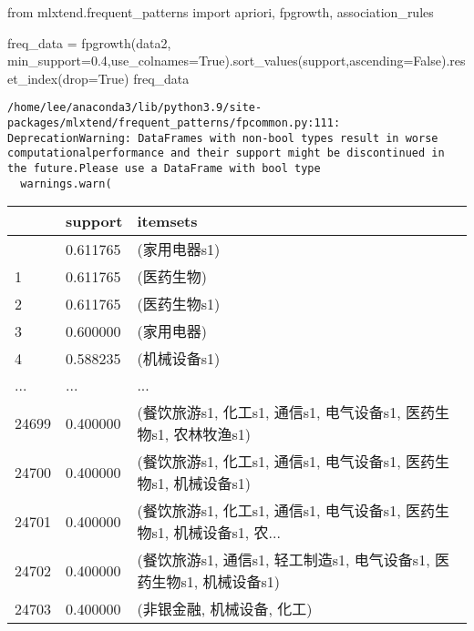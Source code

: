\documentclass[
  letterpaper,
  DIV=11,
  numbers=noendperiod]{scrreprt}
\newenvironment{Shaded}{\begin{snugshade}}{\end{snugshade}}
\newcommand{\FloatTok}[1]{\textcolor[rgb]{0.68,0.00,0.00}{#1}}
\newcommand{\ImportTok}[1]{\textcolor[rgb]{0.00,0.46,0.62}{#1}}
\newcommand{\NormalTok}[1]{\textcolor[rgb]{0.00,0.23,0.31}{#1}}
\newcommand{\OperatorTok}[1]{\textcolor[rgb]{0.37,0.37,0.37}{#1}}
\newcommand{\StringTok}[1]{\textcolor[rgb]{0.13,0.47,0.30}{#1}}
\newcommand{\VariableTok}[1]{\textcolor[rgb]{0.07,0.07,0.07}{#1}}
\begin{document}
\begin{Shaded}
\begin{Highlighting}[]
\ImportTok{from}\NormalTok{ mlxtend.frequent\_patterns }\ImportTok{import}\NormalTok{ apriori, fpgrowth, association\_rules}

\NormalTok{freq\_data }\OperatorTok{=}\NormalTok{ fpgrowth(data2, min\_support}\OperatorTok{=}\FloatTok{0.4}\NormalTok{,use\_colnames}\OperatorTok{=}\VariableTok{True}\NormalTok{).sort\_values(}\StringTok{\textquotesingle{}support\textquotesingle{}}\NormalTok{,ascending}\OperatorTok{=}\VariableTok{False}\NormalTok{).reset\_index(drop}\OperatorTok{=}\VariableTok{True}\NormalTok{)}
\NormalTok{freq\_data}
\end{Highlighting}
\end{Shaded}

\begin{verbatim}
/home/lee/anaconda3/lib/python3.9/site-packages/mlxtend/frequent_patterns/fpcommon.py:111: DeprecationWarning: DataFrames with non-bool types result in worse computationalperformance and their support might be discontinued in the future.Please use a DataFrame with bool type
  warnings.warn(
\end{verbatim}

\begin{longtable}[]{@{}lll@{}}
\toprule\noalign{}
& support & itemsets \\
\midrule\noalign{}
\endhead
\bottomrule\noalign{}
\endlastfoot
0 & 0.611765 & (家用电器s1) \\
1 & 0.611765 & (医药生物) \\
2 & 0.611765 & (医药生物s1) \\
3 & 0.600000 & (家用电器) \\
4 & 0.588235 & (机械设备s1) \\
... & ... & ... \\
24699 & 0.400000 & (餐饮旅游s1, 化工s1, 通信s1, 电气设备s1, 医药生物s1,
农林牧渔s1) \\
24700 & 0.400000 & (餐饮旅游s1, 化工s1, 通信s1, 电气设备s1, 医药生物s1,
机械设备s1) \\
24701 & 0.400000 & (餐饮旅游s1, 化工s1, 通信s1, 电气设备s1, 医药生物s1,
机械设备s1, 农... \\
24702 & 0.400000 & (餐饮旅游s1, 通信s1, 轻工制造s1, 电气设备s1,
医药生物s1, 机械设备s1) \\
24703 & 0.400000 & (非银金融, 机械设备, 化工) \\
\end{longtable}
\end{document}
